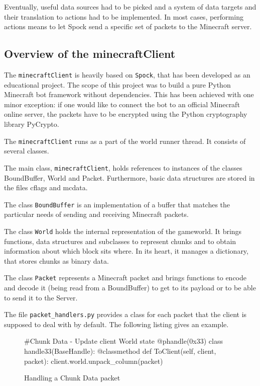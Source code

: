 Eventually, useful data sources had to be picked and a system of data targets and their translation to actions had to be implemented. In most cases, performing actions means to let Spock send a specific set of packets to the Minecraft server.

        \subsection{Overview of the minecraftClient}
The \texttt{minecraftClient} is heavily based on \texttt{Spock}, that has been developed as an educational project. The scope of this project was to build a pure Python Minecraft bot framework without dependencies. This has been achieved with one minor exception: if one would like to connect the bot to an official Minecraft online server, the packets have to be encrypted using the Python cryptography library PyCrypto.

The \texttt{minecraftClient} runs as a part of the world runner thread. It consists of several classes. 

The main class, \texttt{minecraftClient}, holds references to instances of the classes BoundBuffer,  World and Packet. Furthermore, basic data structures are stored in the files cflags and mcdata.

The class \texttt{BoundBuffer} is an implementation of a buffer that matches the particular needs of sending and receiving Minecraft packets.

The class \texttt{World} holds the internal representation of the gameworld. It brings functions, data structures and subclasses to represent chunks and to obtain information about which block sits where. In its heart, it manages a dictionary, that stores chunks as binary data.

The class \texttt{Packet} represents a Minecraft packet and brings functions to encode and decode it (being read from a BoundBuffer) to get to its payload or to be able to send it to the Server.

The file \texttt{packet\_handlers.py} provides a class for each packet that the client is supposed to deal with by default. The following listing gives an example.


		\begin{figure}[ht]
			\centering
			\begin{minipage}{11cm}
				\begin{pseudocode}
#Chunk Data - Update client World state
@phandle(0x33)
class handle33(BaseHandle):
	@classmethod
	def ToClient(self, client, packet):
		client.world.unpack_column(packet)
					\end{pseudocode}
				\caption{Handling a Chunk Data packet}
				\label{packet_handling}
			\end{minipage}
		\end{figure}


